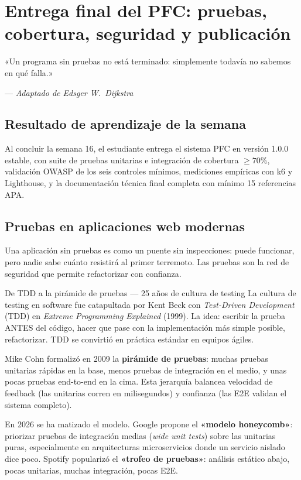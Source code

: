 \documentclass[11pt,a4paper,openany]{book}
\begin{document}
\chapter{Entrega final del PFC: pruebas, cobertura, seguridad y publicación}
\label{cap:semana16}

\epigraph{«Un programa sin pruebas no está terminado: simplemente
todavía no sabemos en qué falla.»}{--- \textit{Adaptado de Edsger W.~Dijkstra}}

\section*{Resultado de aprendizaje de la semana}
Al concluir la semana 16, el estudiante entrega el sistema PFC en
versión 1.0.0 estable, con suite de pruebas unitarias e integración
de cobertura $\geq 70\%$, validación OWASP de los seis controles
mínimos, mediciones empíricas con k6 y Lighthouse, y la documentación
técnica final completa con mínimo 15 referencias APA.

\section{Pruebas en aplicaciones web modernas}

Una aplicación sin pruebas es como un puente sin
inspecciones: puede funcionar, pero nadie sabe cuánto resistirá al
primer terremoto. Las pruebas son la red de seguridad que permite
refactorizar con confianza.


\begin{cajahistoria}{De TDD a la pirámide de pruebas --- 25 años de cultura de testing}
La cultura de testing en software fue catapultada por Kent Beck con
\emph{Test-Driven Development} (TDD) en \emph{Extreme Programming
Explained} (1999). La idea: escribir la prueba ANTES del código,
hacer que pase con la implementación más simple posible, refactorizar.
TDD se convirtió en práctica estándar en equipos ágiles.

Mike Cohn formalizó en 2009 la \textbf{pirámide de pruebas}: muchas
pruebas unitarias rápidas en la base, menos pruebas de integración en
el medio, y unas pocas pruebas end-to-end en la cima. Esta jerarquía
balancea velocidad de feedback (las unitarias corren en milisegundos)
y confianza (las E2E validan el sistema completo).

En 2026 se ha matizado el modelo. Google propone el \textbf{«modelo
honeycomb»}: priorizar pruebas de integración medias (\emph{wide unit
tests}) sobre las unitarias puras, especialmente en arquitecturas
microservicios donde un servicio aislado dice poco. Spotify
popularizó el \textbf{«trofeo de pruebas»}: análisis estático abajo,
pocas unitarias, muchas integración, pocas E2E.
\end{cajahistoria}
\end{document}
